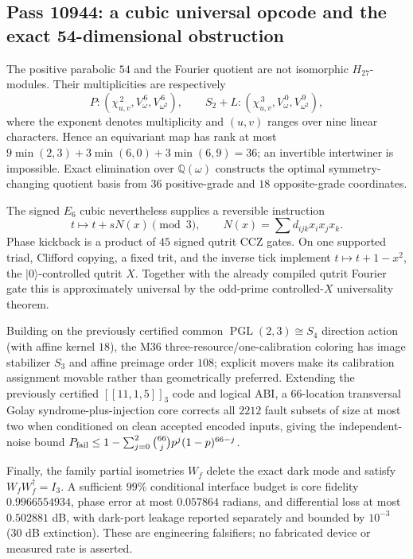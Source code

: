 \subsection{Pass 10944: a cubic universal opcode and the exact 54-dimensional obstruction}

The positive parabolic $54$ and the Fourier quotient are not isomorphic
$H_{27}$-modules.  Their multiplicities are respectively
\[
 P: (\chi_{u,v}^{\,2},V_\omega^{\,6},V_{\omega^2}^{\,6}),\qquad
 S_2+L:(\chi_{u,v}^{\,3},V_\omega^{\,0},V_{\omega^2}^{\,9}),
\]
where the exponent denotes multiplicity and $(u,v)$ ranges over nine linear
characters.  Hence an equivariant map has rank at most
$9\min(2,3)+3\min(6,0)+3\min(6,9)=36$; an invertible intertwiner is
impossible.  Exact elimination over $\mathbb Q(\omega)$ constructs the optimal
symmetry-changing quotient basis from $36$ positive-grade and $18$
opposite-grade coordinates.

The signed $E_6$ cubic nevertheless supplies a reversible instruction
\[
 t\longmapsto t+sN(x)\pmod3,
 \qquad N(x)=\sum d_{ijk}x_ix_jx_k.
\]
Phase kickback is a product of $45$ signed qutrit CCZ gates.  On one supported
triad, Clifford copying, a fixed trit, and the inverse tick implement
$t\mapsto t+1-x^2$, the $|0\rangle$-controlled qutrit $X$.  Together with the
already compiled qutrit Fourier gate this is approximately universal by the
odd-prime controlled-$X$ universality theorem.

Building on the previously certified common
$\operatorname{PGL}(2,3)\cong S_4$ direction action (with affine kernel $18$),
the M36 three-resource/one-calibration coloring has image stabilizer $S_3$ and
affine preimage order $108$; explicit movers make its calibration assignment
movable rather than geometrically preferred.  Extending the previously
certified $[[11,1,5]]_3$ code and logical ABI, a $66$-location transversal
Golay syndrome-plus-injection core
corrects all $2212$ fault subsets of size at most two when conditioned on clean
accepted encoded inputs, giving the independent-noise bound
$P_{\rm fail}\le 1-\sum_{j=0}^2{66\choose j}p^j(1-p)^{66-j}$.

Finally, the family partial isometries $W_f$ delete the exact dark mode and
satisfy $W_fW_f^\dagger=I_3$.  A sufficient $99\%$ conditional interface
budget is core fidelity $0.9966554934$, phase error at most $0.057864$ radians,
and differential loss at most $0.502881$ dB, with dark-port leakage reported
separately and bounded by $10^{-3}$ (30 dB extinction).  These are engineering
falsifiers; no fabricated device or measured rate is asserted.
